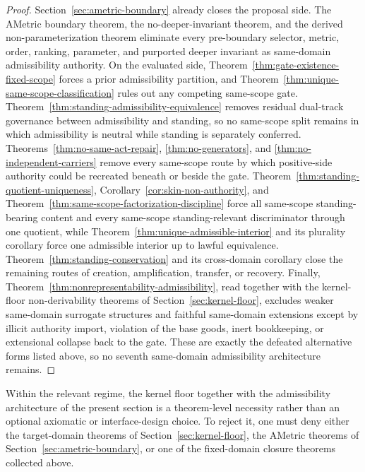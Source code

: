 \begin{proof}
Section~\ref{sec:ametric-boundary} already closes the proposal side. The AMetric boundary theorem, the no-deeper-invariant theorem, and the derived non-parameterization theorem eliminate every pre-boundary selector, metric, order, ranking, parameter, and purported deeper invariant as same-domain admissibility authority. On the evaluated side, Theorem~\ref{thm:gate-existence-fixed-scope} forces a prior admissibility partition, and Theorem~\ref{thm:unique-same-scope-classification} rules out any competing same-scope gate. Theorem~\ref{thm:standing-admissibility-equivalence} removes residual dual-track governance between admissibility and standing, so no same-scope split remains in which admissibility is neutral while standing is separately conferred. Theorems~\ref{thm:no-same-act-repair}, \ref{thm:no-generators}, and \ref{thm:no-independent-carriers} remove every same-scope route by which positive-side authority could be recreated beneath or beside the gate. Theorem~\ref{thm:standing-quotient-uniqueness}, Corollary~\ref{cor:skin-non-authority}, and Theorem~\ref{thm:same-scope-factorization-discipline} force all same-scope standing-bearing content and every same-scope standing-relevant discriminator through one quotient, while Theorem~\ref{thm:unique-admissible-interior} and its plurality corollary force one admissible interior up to lawful equivalence. Theorem~\ref{thm:standing-conservation} and its cross-domain corollary close the remaining routes of creation, amplification, transfer, or recovery. Finally, Theorem~\ref{thm:nonrepresentability-admissibility}, read together with the kernel-floor non-derivability theorems of Section~\ref{sec:kernel-floor}, excludes weaker same-domain surrogate structures and faithful same-domain extensions except by illicit authority import, violation of the base goods, inert bookkeeping, or extensional collapse back to the gate. These are exactly the defeated alternative forms listed above, so no seventh same-domain admissibility architecture remains.
\end{proof}

\begin{corollary}
\label{cor:no-design-choice-reading}
Within the relevant regime, the kernel floor together with the admissibility architecture of the present section is a theorem-level necessity rather than an optional axiomatic or interface-design choice. To reject it, one must deny either the target-domain theorems of Section~\ref{sec:kernel-floor}, the AMetric theorems of Section~\ref{sec:ametric-boundary}, or one of the fixed-domain closure theorems collected above.
\end{corollary}


